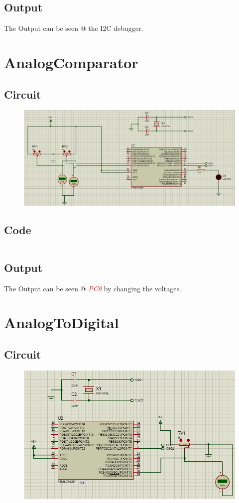 \documentclass[oneside]{book}
\newcommand{\pinFormat}[1]{\emph{\textcolor{red}{#1}}}
\begin{document}
\subsection{Output}
\quad The Output can be seen @ the I2C debugger.


\section{AnalogComparator}
\subsection{Circuit}
\begin{figure}[H]
    \centering
    \includegraphics[height=0.2\textheight]{AnalogComparator.png}
\end{figure}
\subsection{Code}
\inputminted[bgcolor=black]{c}{../programFiles/AnalogComparator.c}

\subsection{Output}
\quad The Output can be seen @ \pinFormat{PC0} by changing the voltages.

\section{AnalogToDigital}
\subsection{Circuit}
\begin{figure}[H]
    \centering
    \includegraphics[height=0.2\textheight]{AnalogToDigital.png}
\end{figure}
\end{document}

